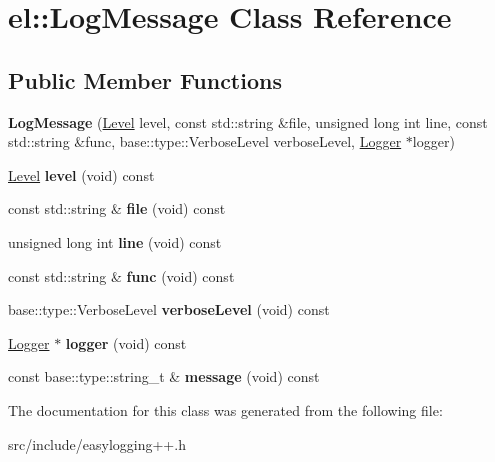 \hypertarget{classel_1_1_log_message}{}\section{el\+:\+:Log\+Message Class Reference}
\label{classel_1_1_log_message}
\subsection*{Public Member Functions}
\begin{DoxyCompactItemize}
\item 
\mbox{\label{classel_1_1_log_message_a6cb875167d28c57e11877f833d733e04}} 
{\bfseries Log\+Message} (\hyperlink{namespaceel_ab0ac6091262344c52dd2d3ad099e8e36}{Level} level, const std\+::string \&file, unsigned long int line, const std\+::string \&func, base\+::type\+::\+Verbose\+Level verbose\+Level, \hyperlink{classel_1_1_logger}{Logger} $\ast$logger)
\item 
\mbox{\label{classel_1_1_log_message_a222670d05b4aab11da4083b69eeb8dea}} 
\hyperlink{namespaceel_ab0ac6091262344c52dd2d3ad099e8e36}{Level} {\bfseries level} (void) const
\item 
\mbox{\label{classel_1_1_log_message_adcced1cf014f9dde378c58e0f993640e}} 
const std\+::string \& {\bfseries file} (void) const
\item 
\mbox{\label{classel_1_1_log_message_a769a6cacac7f4098e52e4e984c08f36f}} 
unsigned long int {\bfseries line} (void) const
\item 
\mbox{\label{classel_1_1_log_message_a6b77bd14c0f79ab8a9157a3be6a414af}} 
const std\+::string \& {\bfseries func} (void) const
\item 
\mbox{\label{classel_1_1_log_message_a6a576d3c2c325173baa7177fe9aacf3b}} 
base\+::type\+::\+Verbose\+Level {\bfseries verbose\+Level} (void) const
\item 
\mbox{\label{classel_1_1_log_message_a94e23201866cc1f9b9ff5bd1da8c9d98}} 
\hyperlink{classel_1_1_logger}{Logger} $\ast$ {\bfseries logger} (void) const
\item 
\mbox{\label{classel_1_1_log_message_a55e99351b41fd7bc05123253868b208b}} 
const base\+::type\+::string\+\_\+t \& {\bfseries message} (void) const
\end{DoxyCompactItemize}


The documentation for this class was generated from the following file\+:\begin{DoxyCompactItemize}
\item 
src/include/easylogging++.\+h\end{DoxyCompactItemize}
